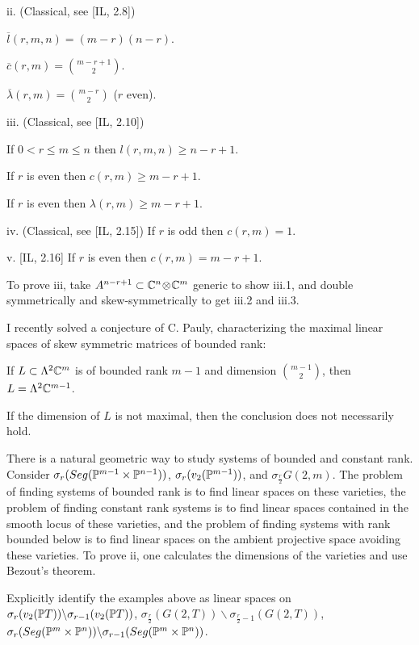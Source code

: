 ii. (Classical, see [IL, 2.8])
\roster
\item $\overline l(r,m,n) = (m-r)(n-r)$.
\item $\overline c(r,m) = \binom{m-r+1}2$.
\item $\overline \lambda(r,m) = \binom{m-r}{2}$ ($r$ even).
\endroster

iii. (Classical, see [IL, 2.10])
\roster
\item If $0 <r \le m \le n$ then $l(r,m,n) \ge n - r + 1$.
\item If $r$ is even  
then $c(r,m) \ge m-r+1$.
\item If $r$ is even  
then  $\lambda(r,m) \ge m-r+1$.
\endroster

iv. (Classical, see [IL, 2.15]) If $r$ is odd then $c(r,m) = 1$.

v. [IL, 2.16] If $r$ is even  then $c(r,m) = m - r + 1$.
\endproclaim

To prove iii, 
take  $A^{n-r+1}\subset \Bbb C^{n}\!\otimes\!\Bbb C^{m}$
generic to show iii.1, and double symmetrically and skew-symmetrically
to get iii.2 and iii.3.

  I recently solved a conjecture of C. Pauly, characterizing
the maximal linear spaces of skew symmetric
matrices of bounded rank:

 If $L\subset\Lambda^{2}\Bbb C^{m}$ is of bounded rank
$m-1$ and dimension $\binom{m-1}2$, then $L=\Lambda^{2}\Bbb C^{m-1}$.\endproclaim

If the dimension of $L$ is not maximal, then the conclusion does not
necessarily hold.


 There is a natural geometric way to 
study
 systems of bounded and constant rank.  
Consider $\sigma_r(Seg(\Bbb P^{m-1}\times\Bbb P^{n-1}))$, 
$\sigma_r(v_2(\Bbb P^{m-1}))$, and $\sigma_{\frac r2}G(2,m)$.
The problem
of finding systems of bounded rank is to find linear spaces
on these varieties, the problem of finding constant rank systems is to find
linear spaces contained in the smooth locus of these varieties,
and the problem of finding systems with rank
bounded below  is to find linear spaces on the ambient projective
space avoiding these varieties. To prove ii,   one 
 calculates the dimensions of the varieties and use Bezout's theorem.



 Explicitly identify the examples above as
linear spaces on\linebreak 
$
\sigma_r(v_2(\Bbb P T))\backslash
\sigma_{r-1}(v_2(\Bbb P T))$, 
$\sigma_{\frac r2 }(G(2,T))\backslash \sigma_{\frac r2-1}(G(2,T))$, 
$
\sigma_r(Seg(\Bbb P^{m}\times \Bbb P^{n}))\backslash
\sigma_{r-1}(Seg(\Bbb P^{m}\times \Bbb P^{n}))$.

